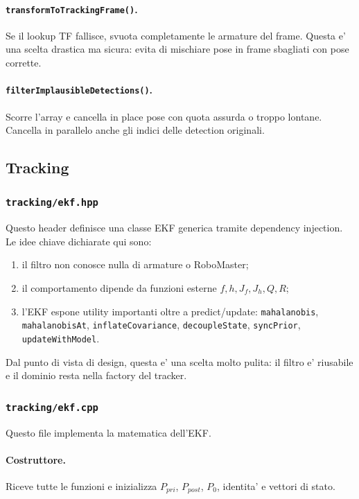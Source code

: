 \documentclass[11pt,a4paper]{article}
\newcommand{\code}[1]{\texttt{#1}}
\begin{document}
\paragraph{\code{transformToTrackingFrame()}.}
Se il lookup TF fallisce, svuota completamente le armature del frame. Questa e' una scelta drastica ma sicura: evita di mischiare pose in frame sbagliati con pose corrette.

\paragraph{\code{filterImplausibleDetections()}.}
Scorre l'array e cancella in place pose con quota assurda o troppo lontane. Cancella in parallelo anche gli indici delle detection originali.

\subsection{Tracking}

\subsubsection{\code{tracking/ekf.hpp}}

Questo header definisce una classe EKF generica tramite dependency injection. Le idee chiave dichiarate qui sono:
\begin{enumerate}[leftmargin=1.4em]
  \item il filtro non conosce nulla di armature o RoboMaster;
  \item il comportamento dipende da funzioni esterne \(f, h, J_f, J_h, Q, R\);
  \item l'EKF espone utility importanti oltre a predict/update: \code{mahalanobis}, \code{mahalanobisAt}, \code{inflateCovariance}, \code{decoupleState}, \code{syncPrior}, \code{updateWithModel}.
\end{enumerate}

Dal punto di vista di design, questa e' una scelta molto pulita: il filtro e' riusabile e il dominio resta nella factory del tracker.

\subsubsection{\code{tracking/ekf.cpp}}

Questo file implementa la matematica dell'EKF.

\paragraph{Costruttore.}
Riceve tutte le funzioni e inizializza \(P_{pri}\), \(P_{post}\), \(P_0\), identita' e vettori di stato.
\end{document}

